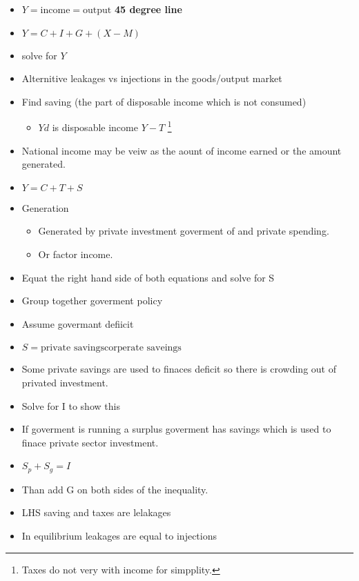 \documentclass[twocolumn]{article}
\providecommand{\tightlist}{%
  \setlength{\itemsep}{0pt}\setlength{\parskip}{0pt}}
\begin{document}
\begin{itemize}
\tightlist
\item
  \(Y = \text{income} = \text{output}\) \textbf{45 degree line}
\item
  \(Y = C + I + G + (X-M)\)
\item
  solve for \(Y\)
\item
  Alternitive leakages vs injections in the goods/output market
\item
  Find saving (the part of disposable income which is not consumed)

  \begin{itemize}
  \tightlist
  \item
    \(Yd\) is disposable income \(Y -T\) \footnote{Taxes do not very
      with income for simpplity.}
  \end{itemize}
\item
  National income may be veiw as the aount of income earned or the
  amount generated.
\item
  \(Y= C + T + S\)
\item
  Generation

  \begin{itemize}
  \tightlist
  \item
    Generated by private investment goverment of and private spending.
  \item
    Or factor income.
  \end{itemize}
\item
  Equat the right hand side of both equations and solve for S
\item
  Group together goverment policy
\item
  Assume govermant defiicit
\item
  \(S= \text{private savings} \text{corperate saveings}\)
\item
  Some private savings are used to finaces deficit so there is crowding
  out of privated investment.
\item
  Solve for I to show this
\item
  If goverment is running a surplus goverment has savings which is used
  to finace private sector investment.
\item
  \(S_p + S_g = I\)
\item
  Than add G on both sides of the inequality.
\item
  LHS saving and taxes are lelakages
\item
  In equilibrium leakages are equal to injections
\end{itemize}
\end{document}
